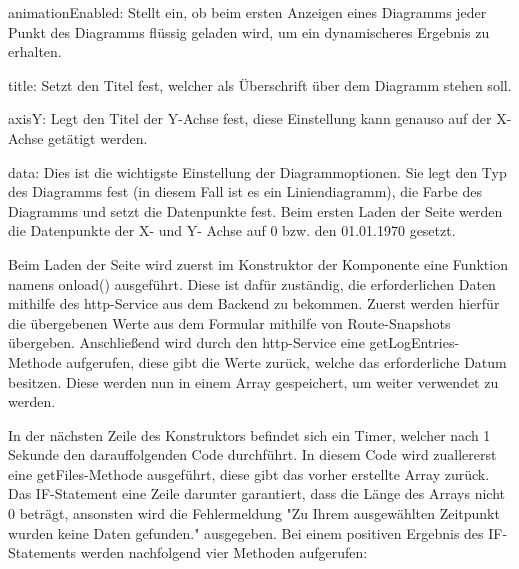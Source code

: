 \begin{compactitem}
    \item animationEnabled: Stellt ein, ob beim ersten Anzeigen eines Diagramms jeder Punkt des Diagramms flüssig geladen wird, um ein dynamischeres Ergebnis zu erhalten.    
    \item title: Setzt den Titel fest, welcher als Überschrift über dem Diagramm stehen soll.          
    \item axisY: Legt den Titel der Y-Achse fest, diese Einstellung kann genauso auf der X-Achse getätigt werden.    
    \item data: Dies ist die wichtigste Einstellung der Diagrammoptionen. Sie legt den Typ des Diagramms fest (in diesem Fall ist es ein Liniendiagramm), die Farbe des Diagramms und setzt die Datenpunkte fest. Beim ersten Laden der Seite werden die Datenpunkte der X- und Y- Achse auf 0 bzw. den 01.01.1970 gesetzt. 
\end{compactitem}

Beim Laden der Seite wird zuerst im Konstruktor der Komponente eine Funktion namens onload() ausgeführt. Diese ist dafür zuständig, die erforderlichen Daten mithilfe des http-Service aus dem Backend zu bekommen. Zuerst werden hierfür die übergebenen Werte aus dem Formular mithilfe von Route-Snapshots übergeben. Anschließend wird durch den http-Service eine getLogEntries-Methode aufgerufen, diese gibt die Werte zurück, welche das erforderliche Datum besitzen. Diese werden nun in einem Array gespeichert, um weiter verwendet zu werden.

In der nächsten Zeile des Konstruktors befindet sich ein Timer, welcher nach 1 Sekunde den darauffolgenden Code durchführt. In diesem Code wird zuallererst eine getFiles-Methode ausgeführt, diese gibt das vorher erstellte Array zurück. Das IF-Statement eine Zeile darunter garantiert, dass die Länge des Arrays nicht 0 beträgt, ansonsten wird die Fehlermeldung "Zu Ihrem ausgewählten Zeitpunkt wurden keine Daten gefunden." ausgegeben. Bei einem positiven Ergebnis des IF-Statements werden nachfolgend vier Methoden aufgerufen: 

